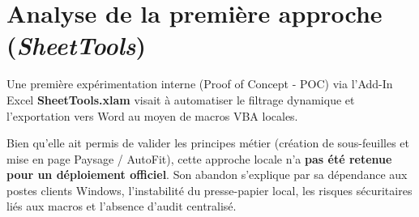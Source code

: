 \section{Analyse de la première approche (\textit{SheetTools})}

Une première expérimentation interne (Proof of Concept - POC) via l'Add-In Excel \textbf{SheetTools.xlam} visait à automatiser le filtrage dynamique et l'exportation vers Word au moyen de macros VBA locales.

Bien qu'elle ait permis de valider les principes métier (création de sous-feuilles et mise en page Paysage / AutoFit), cette approche locale n'a \textbf{pas été retenue pour un déploiement officiel}. Son abandon s'explique par sa dépendance aux postes clients Windows, l'instabilité du presse-papier local, les risques sécuritaires liés aux macros et l'absence d'audit centralisé.

